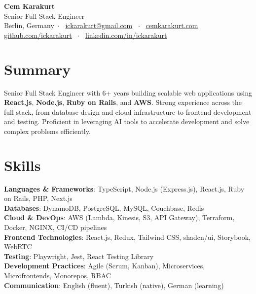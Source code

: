\documentclass[letterpaper,10pt]{article}
\makeatletter
\newcommand{\skills}[1]{\textbf{#1}}
\def\name{Cem Karakurt}
\def\city{Berlin, Germany}
\def\email{ickarakurt@gmail.com}
\def\LinkedIn{ickarakurt}
\def\github{ickarakurt}
\def\role{Senior Full Stack Engineer}
\makeatother
\begin{document}
\begin{center}
    {\Huge \skills{\name}} \\[0.2cm]
    {\color{highlight} \Large{\role}} \\[0.2cm]
    \city \ $\cdot$ \ \href{mailto:\email}{\email} \ $\cdot$ \ \href{https://cemkarakurt.com}{cemkarakurt.com} \\
    \href{https://github.com/\github}{github.com/\github} \ $\cdot$ \ \href{https://www.linkedin.com/in/\LinkedIn}{linkedin.com/in/\LinkedIn}
\end{center}

\vspace{1em}

\section{Summary}

Senior Full Stack Engineer with 6+ years building scalable web applications using \textbf{React.js}, \textbf{Node.js}, \textbf{Ruby on Rails}, and \textbf{AWS}. Strong experience across the full stack, from database design and cloud infrastructure to frontend development and testing. Proficient in leveraging AI tools to accelerate development and solve complex problems efficiently.
\section{Skills}

\noindent
\skills{Languages \& Frameworks}: TypeScript, Node.js (Express.js), React.js, Ruby on Rails, PHP, Next.js \\
\skills{Databases}: DynamoDB, PostgreSQL, MySQL, Couchbase, Redis \\
\skills{Cloud \& DevOps}: AWS (Lambda, Kinesis, S3, API Gateway), Terraform, Docker, NGINX, CI/CD pipelines \\
\skills{Frontend Technologies}: React.js, Redux, Tailwind CSS, shadcn/ui, Storybook, WebRTC \\
\skills{Testing}: Playwright, Jest, React Testing Library \\
\skills{Development Practices}: Agile (Scrum, Kanban), Microservices, Microfrontends, Monorepos, RBAC \\
\skills{Communication}: English (fluent), Turkish (native), German (learning)
\end{document}
